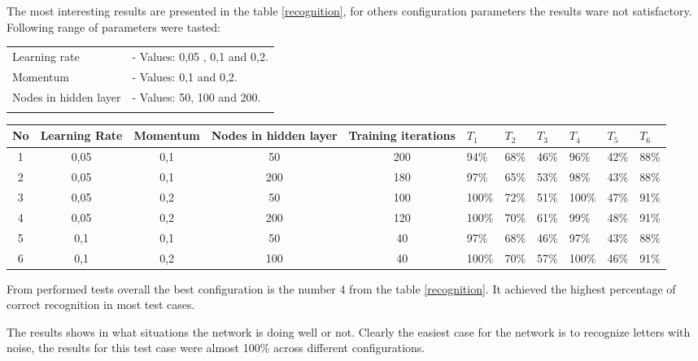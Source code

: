 \documentclass[a4paper, 11pt]{article}
\begin{document}
The most interesting results are presented in the table \ref{recognition}, for others configuration parameters the results ware not satisfactory. Following range of parameters were tasted:

\begin{tabular}{ll}
\\
Learning rate & - Values: 0,05 , 0,1 and 0,2.\\
Momentum & - Values: 0,1 and 0,2.\\
Nodes in hidden layer & - Values: 50, 100 and 200.\\
\\
\end{tabular}

\begin{center}
  \begin{tabulary}{\textwidth}{|C|C|C|C|C|m{0.8cm}|m{0.8cm}|m{0.8cm}|m{0.8cm}|m{0.8cm}|m{0.8cm}|}
  \hline
    No & Learning Rate & Momentum & Nodes in hidden layer & Training iterations & \(T_{1}\) & \(T_{2}\) & \(T_{3}\) & \(T_{4}\) & \(T_{5}\) & \(T_{6}\) \\
     & 0,05 & 0,1 & 50 & 200 & 94\% & 68\% & 46\% & 96\% & 42\% & 88\% \\
     & 0,05 & 0,1 & 200 & 180 & 97\% & 65\% & 53\% & 98\% & 43\% & 88\% \\
     & 0,05 & 0,2 & 50 & 100 & 100\% & 72\% & 51\% & 100\% & 47\% & 91\% \\
    \hline
    4 & 0,05 & 0,2 & 200 & 120 & 100\% & 70\% & 61\% & 99\% & 48\% & 91\% \\
     & 0,1 & 0,1 & 50 & 40 & 97\% & 68\% & 46\% & 97\% & 43\% & 88\% \\
     & 0,1 & 0,2 & 100 & 40 & 100\% & 70\% & 57\% & 100\% & 46\% & 91\% \\
    \hline
  \end{tabulary}
  \label{recognition}
\end{center}

From performed tests overall the best configuration is the number 4 from the table \ref{recognition}. It achieved the highest percentage of correct recognition in most test cases.

The results shows in what situations the network is doing well or not. Clearly the easiest case for the network is to recognize letters with noise, the results for this test case were almost 100\% across different configurations.
\end{document}
